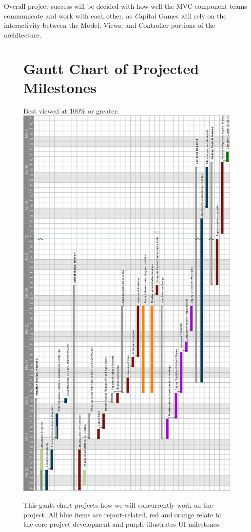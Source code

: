 Overall project success will be decided with how well the MVC component teams communicate and work with each other, as {\textit Capital Games} will rely on the interactivity between the Model, Views, and Controller portions of the architecture.  

\hfil\eject \pdfpagewidth=8.5in \pdfpageheight=16in
\begin{figure}
\section{Gantt Chart of Projected Milestones} 
Best viewed at 100\% or greater:    
\centering
\includegraphics[width=6.5in]{./img/gantt.png}
\caption{This gantt chart projects how we will concurrently work on
the project. All blue items are report-related, red and orange relate
to the core project development and purple illustrates UI milestones.}
\end{figure}
